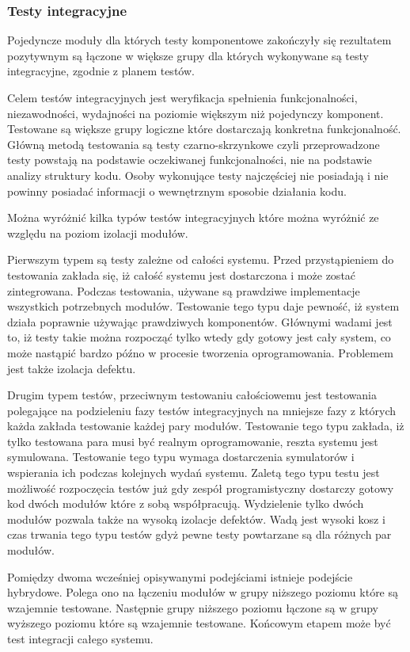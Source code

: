 \subsubsection{Testy integracyjne} 
Pojedyncze moduły dla których testy komponentowe zakończyły się rezultatem pozytywnym są łączone w większe grupy dla których wykonywane są testy integracyjne, zgodnie z planem testów.

Celem testów integracyjnych jest weryfikacja spełnienia funkcjonalności, niezawodności, wydajności na poziomie większym niż pojedynczy komponent. Testowane są większe grupy logiczne które dostarczają konkretna funkcjonalność. Główną metodą testowania są testy czarno-skrzynkowe czyli przeprowadzone testy powstają na podstawie oczekiwanej funkcjonalności, nie na podstawie analizy struktury kodu. Osoby wykonujące testy najczęściej nie posiadają i nie powinny posiadać informacji o wewnętrznym sposobie działania kodu.

Można wyróżnić kilka typów testów integracyjnych które można wyróżnić ze względu na poziom izolacji modułów.

Pierwszym typem są testy zależne od całości systemu. Przed przystąpieniem do testowania zakłada się, iż całość systemu jest dostarczona i może zostać zintegrowana.  Podczas testowania, używane są prawdziwe implementacje wszystkich potrzebnych modułów. Testowanie tego typu daje pewność, iż system działa poprawnie używając prawdziwych komponentów. Głównymi wadami jest to, iż testy takie można rozpocząć tylko wtedy gdy gotowy jest cały system, co może nastąpić bardzo późno w procesie tworzenia oprogramowania. Problemem jest także izolacja defektu.

Drugim typem testów, przeciwnym testowaniu całościowemu jest testowania polegające na podzieleniu fazy testów integracyjnych na mniejsze fazy z których każda zakłada testowanie każdej pary modułów. Testowanie tego typu zakłada, iż tylko testowana para musi być realnym oprogramowanie, reszta systemu jest symulowana. Testowanie tego typu wymaga dostarczenia symulatorów i wspierania ich podczas kolejnych wydań systemu. Zaletą tego typu testu jest możliwość rozpoczęcia testów już gdy zespół programistyczny dostarczy gotowy kod dwóch modułów które z sobą współpracują. Wydzielenie tylko dwóch modułów pozwala także na wysoką izolacje defektów. Wadą jest wysoki kosz i czas trwania tego typu testów gdyż pewne testy powtarzane są dla różnych par modułów.

Pomiędzy dwoma wcześniej opisywanymi podejściami istnieje podejście hybrydowe. Polega ono na łączeniu modułów w grupy niższego poziomu które są wzajemnie testowane. Następnie grupy niższego poziomu łączone są w grupy wyższego poziomu które są wzajemnie testowane. Końcowym etapem może być test integracji całego systemu.

